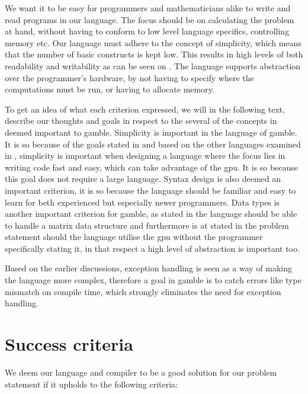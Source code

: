 We want it to be easy for programmers and mathematicians alike to write and read programs in our language.
The focus should be on calculating the problem at hand, without having to conform to low level language specifics, controlling memory etc.
Our language must adhere to the concept of simplicity, which means that the number of basic constructs is kept low. 
This results in high levels of both readability and writability as can be seen on .
The language supports abstraction over the programmer's hardware, by not having to specify where the computations must be run, or having to allocate memory.

To get an idea of what each criterion expressed, we will in the following text, describe our thoughts and goals in respect to the several of the  concepts in  deemed important to \gls{gamble}.
Simplicity is important in the language of \gls{gamble}.
It is so because of the goals stated in  and based on the other languages examined in , simplicity is important when designing a language where the focus lies in writing code fast and easy, which can take advantage of the \acrshort{gpu}.
It is so because this goal does not require a large language.
Syntax design is also deemed an important criterion, it is so because the language should be familiar and easy to learn for beth experienced but especially newer programmers.
Data types is another important criterion for \gls{gamble}, as stated in  the language should be able to handle a matrix data structure and furthermore is at stated in the problem statement should the language utilise the \acrshort{gpu} without the programmer specifically stating it, in that respect a high level of abstraction is important too. 

Based on the earlier discussions, exception handling is seen as a way of making the language more complex, therefore a goal in \gls{gamble} is to catch errors like type mismatch on compile time, which strongly eliminates the need for exception handling.


\section{Success criteria}\label{sec:OurCriterias}
We deem our language and compiler to be a good solution for our problem statement if it upholds to the following criteria:

